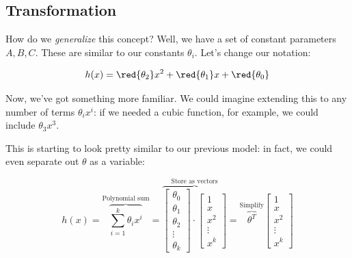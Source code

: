     \subsecdiv
    
    \subsection*{Transformation}
    
        How do we \textit{generalize} this concept? Well, we have a set of constant parameters $A, B, C$. These are similar to our constants $\theta_i$. Let's change our notation:
    
        \begin{equation}
            h(x) = \red{\theta_2} x^2 + \red{\theta_1} x + \red{\theta_0}
        \end{equation}
    
        Now, we've got something more familiar. We could imagine extending this to any number of terms $\theta_i x^i$: if we needed a cubic function, for example, we could include $\theta_3 x^3$.

        This is starting to look pretty similar to our previous model: in fact, we could even separate out $\theta$ as a variable:

        \begin{equation}
            h(x) = 
            \overbrace{
                \sum_{i=1}^{k}
                \theta_i x^i
            }^{\text{Polynomial sum}}
            =
            \overbrace{
            \begin{bmatrix}
             \theta_0 \\ \theta_1 \\ \theta_2 \\ \vdots \\ \theta_k
            \end{bmatrix}
            \cdot 
            \begin{bmatrix}
                1 \\ x \\ x^2 \\ \vdots \\ x^k
            \end{bmatrix}
            }^{\text{Store as vectors}}
            = 
            \overbrace{
            \theta^T
            }^{\text{Simplify}}
            \begin{bmatrix}
                1 \\ x \\ x^2 \\ \vdots \\ x^k
            \end{bmatrix}
        \end{equation}

